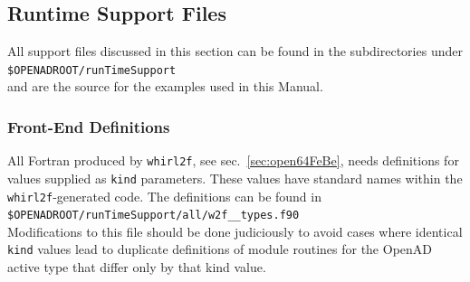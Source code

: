 \documentclass{book}
\newcommand{\refsec}[1]{{sec.~\ref{#1}}}
\begin{document}
\subsection{Runtime Support Files}  
All support files discussed in this section can be found in the subdirectories under  
\\[1ex] 
\hspace*{.3cm}\lstinline{$OPENADROOT/runTimeSupport}\\[1ex] %
and are the source for the examples used in this Manual.

\subsubsection{Front-End Definitions}
All Fortran produced by \lstinline{whirl2f}, see \refsec{sec:open64FeBe}, needs 
definitions for values supplied as \lstinline{kind} parameters. 
These values have standard names within the \lstinline{whirl2f}-generated code. 
The definitions can be found in \\[1ex]
\hspace*{.3cm}\lstinline{$OPENADROOT/runTimeSupport/all/w2f__types.f90}\\[1ex] %
Modifications to this file should be done judiciously to avoid cases where identical 
\lstinline{kind} values lead to duplicate definitions of module routines for 
the OpenAD active type that differ 
only by that kind value.
\end{document}
